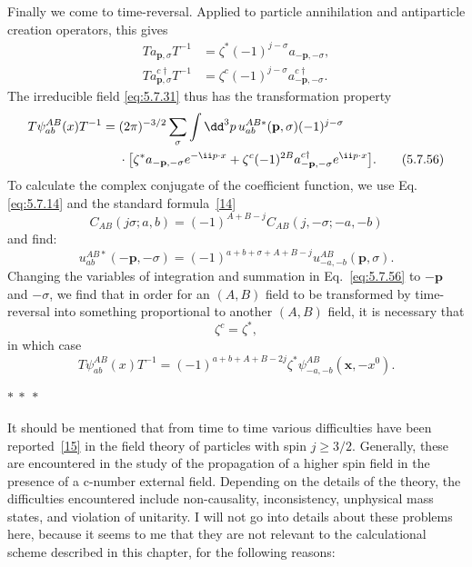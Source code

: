 Finally we come to time-reversal. Applied to particle annihilation and
antiparticle creation operators, this gives
\begin{align}
T a_{\mathbf p,\sigma}T^{-1}&=\zeta^*(-1)^{j-\sigma}
a_{-\mathbf p,-\sigma},
\tag{5.7.54}\label{eq:5.7.54}\\
T a^{c\dagger}_{\mathbf p,\sigma}T^{-1}&=\zeta^c(-1)^{j-\sigma}
a^{c\dagger}_{-\mathbf p,-\sigma}.
\tag{5.7.55}\label{eq:5.7.55}
\end{align}
The irreducible field \eqref{eq:5.7.31} thus has the transformation property
\begin{align}
T\psi^{AB}_{ab}(x)T^{-1}={}&(2\pi)^{-3/2}\sum_\sigma\int \dd^3p\,
u^{AB*}_{ab}(\mathbf p,\sigma)(-1)^{j-\sigma}
\notag\\
&\cdot\bigl[\zeta^*a_{-\mathbf p,-\sigma}e^{-\ii p\cdot x}
+\zeta^c(-1)^{2B}a^{c\dagger}_{-\mathbf p,-\sigma}e^{\ii p\cdot x}\bigr].
\tag{5.7.56}\label{eq:5.7.56}
\end{align}
To calculate the complex conjugate of the coefficient function, we use Eq.
\eqref{eq:5.7.14} and the standard formula~\hyperref[ref:5.14]{[14]}
\begin{equation}
C_{AB}(j\sigma;a,b)=(-1)^{A+B-j}C_{AB}(j,-\sigma;-a,-b)
\tag{5.7.57}\label{eq:5.7.57}
\end{equation}
and find:
\begin{equation}
u^{AB*}_{ab}(-\mathbf p,-\sigma)=
(-1)^{a+b+\sigma+A+B-j}u^{AB}_{-a,-b}(\mathbf p,\sigma).
\tag{5.7.58}\label{eq:5.7.58}
\end{equation}
Changing the variables of integration and summation in Eq.~\eqref{eq:5.7.56} to
$-\mathbf p$ and $-\sigma$, we find that in order for an $(A,B)$ field to be
transformed by time-reversal into something proportional to another $(A,B)$
field, it is necessary that
\begin{equation}
\zeta^c=\zeta^*,
\tag{5.7.59}\label{eq:5.7.59}
\end{equation}
in which case
\begin{equation}
T\psi^{AB}_{ab}(x)T^{-1}=
(-1)^{a+b+A+B-2j}\zeta^*\psi^{AB}_{-a,-b}(\mathbf x,-x^0).
\tag{5.7.60}\label{eq:5.7.60}
\end{equation}

\begin{center}
$*\ *\ *$
\end{center}

It should be mentioned that from time to time various difficulties have been
reported~\hyperref[ref:5.15]{[15]} in the field theory of particles with spin $j\geq 3/2$.
Generally, these are encountered in the study of the propagation of a higher
spin field in the presence of a c-number external field. Depending on the
details of the theory, the difficulties encountered include non-causality,
inconsistency, unphysical mass states, and violation of unitarity. I will not
go into details about these problems here, because it seems to me that they are
not relevant to the calculational scheme described in this chapter, for the
following reasons:

